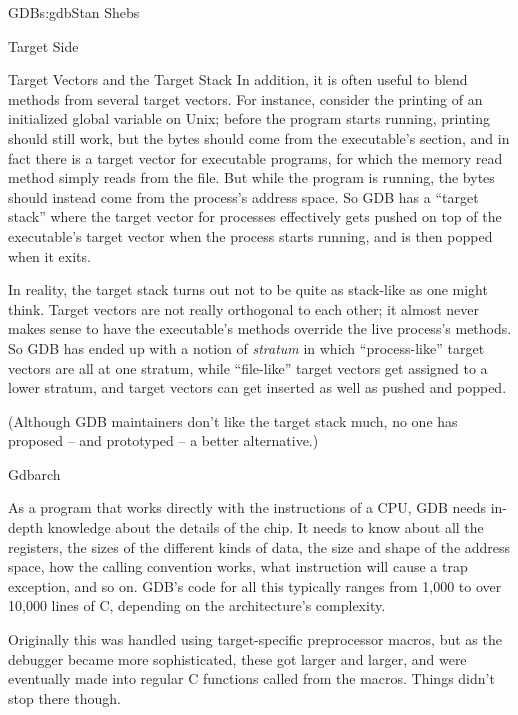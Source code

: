 \begin{aosachapter}{GDB}{s:gdb}{Stan Shebs}
\begin{aosasect1}{Target Side}
\begin{aosasect2}{Target Vectors and the Target Stack}
In addition, it is often useful to blend methods from several target
vectors.  For instance, consider the printing of an initialized global
variable on Unix; before the program starts running, printing should
still work, but the bytes should come from the executable's
 section, and in fact there is a target vector for
executable programs, for which the memory read method simply reads
from the file.  But while the program is running, the bytes should
instead come from the process's address space.  So GDB has a ``target
stack'' where the target vector for processes effectively gets pushed
on top of the executable's target vector when the process starts
running, and is then popped when it exits.


In reality, the target stack turns out not to be quite as stack-like
as one might think.  Target vectors are not really orthogonal to each
other; it almost never makes sense to have the executable's methods
override the live process's methods.  So GDB has ended up with a
notion of {\em stratum} in which ``process-like'' target vectors are
all at one stratum, while ``file-like'' target vectors get assigned to
a lower stratum, and target vectors can get inserted as well as pushed
and popped.

(Although GDB maintainers don't like the target stack much, no one has
proposed -- and prototyped -- a better alternative.)

\end{aosasect2}

\begin{aosasect2}{Gdbarch}

As a program that works directly with the instructions of a CPU, GDB
needs in-depth knowledge about the details of the chip.  It needs to
know about all the registers, the sizes of the different kinds of
data, the size and shape of the address space, how the calling
convention works, what instruction will cause a trap exception, and so
on.  GDB's code for all this typically ranges from 1,000 to over
10,000 lines of C, depending on the architecture's complexity.

Originally this was handled using target-specific preprocessor macros,
but as the debugger became more sophisticated, these got larger and
larger, and were eventually made into regular C functions called from
the macros.  Things didn't stop there though.


\end{aosasect2}
\end{aosasect1}
\end{aosachapter}
